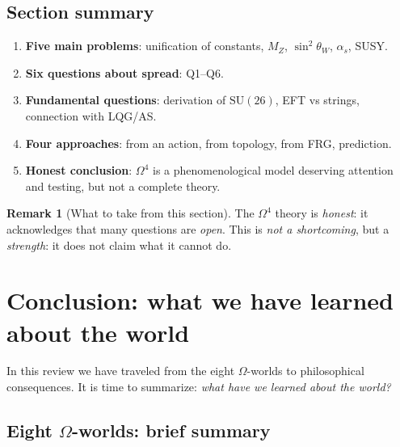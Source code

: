 \documentclass[11pt,a4paper]{article}
\newcommand{\SU}{\mathrm{SU}}
\newcommand{\Om}{\Omega^4}
\theoremstyle{definition}
\newtheorem{remark}[theorem]{Remark}
\begin{document}
\subsection{Section summary}
\label{subsec:open-summary}

\begin{enumerate}
    \item \textbf{Five main problems}: unification of constants, 
          $M_Z$, $\sin^2\theta_W$, $\alpha_s$, SUSY.
    \item \textbf{Six questions about spread}: Q1--Q6.
    \item \textbf{Fundamental questions}: derivation of $\SU(26)$, 
          EFT vs strings, connection with LQG/AS.
    \item \textbf{Four approaches}: from an action, from topology, 
          from FRG, prediction.
    \item \textbf{Honest conclusion}: $\Om$ is a phenomenological 
          model deserving attention and testing, but 
          not a complete theory.
\end{enumerate}

\begin{remark}[What to take from this section]
\label{rem:open-takeaway}
The $\Om$ theory is \emph{honest}: it acknowledges that many 
questions are \emph{open}. This is \emph{not a shortcoming}, but 
a \emph{strength}: it does not claim what it 
cannot do.
\end{remark}

\section{Conclusion: what we have learned about the world}
\label{sec:conclusions}

In this review we have traveled from the eight $\Omega$-worlds 
to philosophical consequences. It is time to summarize: \emph{what have we 
learned about the world?}

\subsection{Eight $\Omega$-worlds: brief summary}
\label{subsec:conclusions-worlds}
\end{document}

